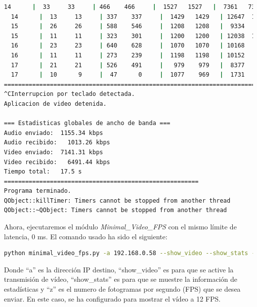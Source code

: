 \begin{lstlisting}[language=bash,basicstyle=\ttfamily\scriptsize]
  14      |  33     33     | 466    466     |  1527   1527   |  7361   7361   |  50     75
  14      |  13     13     | 337    337     |  1429   1429   | 12647  12647   |  33     76
  15      |  26     26     | 588    546     |  1208   1208   |  9334   8666   |  18     79
  15      |  11     11     | 323    301     |  1200   1200   | 12038  11217   |  23     77
  16      |  23     23     | 640    628     |  1070   1070   | 10168   9977   |  21     73
  16      |  11     11     | 273    239     |  1198   1198   | 10152   8885   |  29     74
  17      |  21     21     | 526    491     |   979    979   |  8377   7819   |  17     78
  17      |  10      9     |  47      0     |  1077    969   |  1731      0   |  16     79
============================================================================================
^CInterrupcion por teclado detectada.
Aplicacion de video detenida.

=== Estadisticas globales de ancho de banda ===
Audio enviado:	1155.34 kbps
Audio recibido:   1013.26 kbps
Video enviado:	7141.31 kbps
Video recibido:   6491.44 kbps
Tiempo total: 	17.5 s
=======================================================
Programa terminado.
QObject::killTimer: Timers cannot be stopped from another thread
QObject::~QObject: Timers cannot be stopped from another thread
\end{lstlisting}
\vspace{\baselineskip}

\newpage

Ahora, ejecutaremos el módulo \textit{Minimal\_Video\_FPS} con el mismo límite de latencia, 0 ms. El comando usado ha sido el siguiente:

\begin{lstlisting}[language=bash, basicstyle=\ttfamily\scriptsize]
    python minimal_video_fps.py -a 192.168.0.58 --show_video --show_stats -z 12
\end{lstlisting}
Donde ``a'' es la dirección IP destino, ``show\_video'' es para que se active la transmisión de vídeo, ``show\_stats'' es para que se muestre la información de estadísticas y ``z'' es el numero de fotogramas por segundo (FPS) que se desea enviar. En este caso, se ha configurado para mostrar el vídeo a 12 FPS.
\vspace{\baselineskip}


